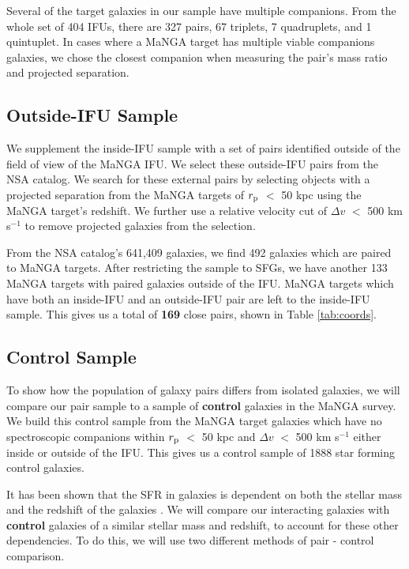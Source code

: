 \documentclass[iop,revtex4,twocolumn,apj,numberedappendix,appendixfloats]{emulateapj}
\begin{document}
Several of the target galaxies in our sample have multiple companions. From the whole set of 404 IFUs, there are 327 pairs, 67 triplets, 7 quadruplets, and 1 quintuplet. In cases where a MaNGA target has multiple viable companions galaxies, we chose the closest companion when measuring the pair's mass ratio and projected separation. 

\subsection{Outside-IFU Sample}\label{sec:outside}

We supplement the inside-IFU sample with a set of pairs identified outside of the field of view of the MaNGA IFU. We select these outside-IFU pairs from the NSA catalog. We search for these external pairs by selecting objects with a projected separation from the MaNGA targets of $r_{\rm p}$ $<$ 50 kpc using the MaNGA target's redshift. We further use a relative velocity cut of $\Delta v$ $<$ 500 km s$^{-1}$ to remove projected galaxies from the selection. 

From the NSA catalog's 641,409 galaxies, we find 492 galaxies which are paired to MaNGA targets. After restricting the sample to SFGs, we have another 133 MaNGA targets with paired galaxies outside of the IFU. MaNGA targets which have both an inside-IFU and an outside-IFU pair are left to the inside-IFU sample. This gives us a total of \textbf{169} close pairs, shown in Table \ref{tab:coords}.

\subsection{Control Sample}\label{sec:control}

To show how the population of galaxy pairs differs from isolated galaxies, we will compare our pair sample to a sample of \textbf{control} galaxies in the MaNGA survey. We build this control sample from the MaNGA target galaxies which have no spectroscopic companions within $r_{\rm p}$ $<$ 50 kpc and $\Delta v$ $<$ 500 km s$^{-1}$ either inside or outside of the IFU. This gives us a control sample of 1888 star forming control galaxies. 

It has been shown that the SFR in galaxies is dependent on both the stellar mass and the redshift of the galaxies \citep[e.g.,][]{Noeske:2007}. We will compare our interacting galaxies with \textbf{control} galaxies of a similar stellar mass and redshift, to account for these other dependencies. To do this, we will use two different methods of pair - control comparison. 
\end{document}
